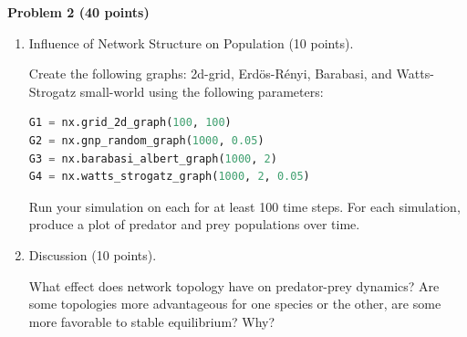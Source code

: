 \documentclass{article}
\newenvironment{problem}[2][Problem]
    { \begin{mdframed}[backgroundcolor=gray!20] \textbf{#1 #2} \\}
    {  \end{mdframed}}
\begin{document}
\begin{problem}{2 (40 points)}
\begin{enumerate}[label=(\alph*)]
        If you need to adjust starting populations or your $\alpha, \beta, \gamma, \delta$ parameters to produce interesting results, do so. For example, if you find that all the predators quickly die without reproducing, you may need to increase $\beta$ or $\gamma$ or decrease $\delta$ a little.
        
        You do not need to produce a plot like the one above, but it may help your debugging.

        \item Influence of Network Structure on Population (10 points).

        Create the following graphs: 2d-grid, Erd\"{o}s-R\'{e}nyi, Barabasi, and Watts-Strogatz small-world using the following parameters:

        \begin{lstlisting}[language=python,numbers=none]
G1 = nx.grid_2d_graph(100, 100)
G2 = nx.gnp_random_graph(1000, 0.05)
G3 = nx.barabasi_albert_graph(1000, 2)
G4 = nx.watts_strogatz_graph(1000, 2, 0.05)
        \end{lstlisting}
        
        Run your simulation on each for at least 100 time steps. For each simulation, produce a plot of predator and prey populations over time.

        \item Discussion (10 points).

        What effect does network topology have on predator-prey dynamics? Are some topologies more advantageous for one species or the other, are some more favorable to stable equilibrium? Why?

        
    \end{enumerate}
\end{problem}
\end{document}
